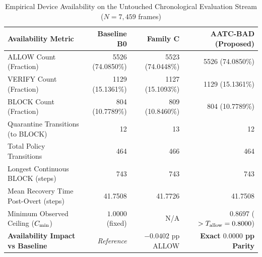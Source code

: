 \begin{table}[t]
\centering
\caption{Empirical Device Availability on the Untouched Chronological Evaluation Stream ($N=7,459$ frames)}
\label{tab:availability_comparison}
\small
\begin{tabular}{lrrr}
\hline
\textbf{Availability Metric} & \textbf{Baseline B0} & \textbf{Family C} & \textbf{AATC-BAD (Proposed)} \\
\hline
ALLOW Count (Fraction) & 5526 (74.0850\%) & 5523 (74.0448\%) & 5526 (74.0850\%) \\
VERIFY Count (Fraction) & 1129 (15.1361\%) & 1127 (15.1093\%) & 1129 (15.1361\%) \\
BLOCK Count (Fraction) & 804 (10.7789\%) & 809 (10.8460\%) & 804 (10.7789\%) \\
Quarantine Transitions (to BLOCK) & 12 & 13 & 12 \\
Total Policy Transitions & 464 & 466 & 464 \\
Longest Continuous BLOCK (steps) & 743 & 743 & 743 \\
Mean Recovery Time Post-Overt (steps) & 41.7508 & 41.7726 & 41.7508 \\
Minimum Observed Ceiling ($C_{\rm min}$) & $1.0000$ (fixed) & N/A & $0.8697$ ($> T_{\rm allow} = 0.8000$) \\
\hline
\textbf{Availability Impact vs Baseline} & \textit{Reference} & $-0.0402$ pp ALLOW & \textbf{Exact $0.0000$ pp Parity} \\
\hline
\end{tabular}
\end{table}
